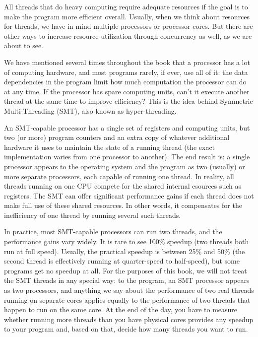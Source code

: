All threads that do heavy computing require adequate resources if the goal is to make the program more efficient overall. Usually, when we think about resources for threads, we have in mind multiple processors or processor cores. But there are other ways to increase resource utilization through concurrency as well, as we are about to see.


We have mentioned several times throughout the book that a processor has a lot of computing hardware, and most programs rarely, if ever, use all of it: the data dependencies in the program limit how much computation the processor can do at any time. If the processor has spare computing units, can't it execute another thread at the same time to improve efficiency? This is the idea behind Symmetric Multi-Threading (SMT), also known as hyper-threading.

An SMT-capable processor has a single set of registers and computing units, but two (or more) program counters and an extra copy of whatever additional hardware it uses to maintain the state of a running thread (the exact implementation varies from one processor to another). The end result is: a single processor appears to the operating system and the program as two (usually) or more separate processors, each capable of running one thread. In reality, all threads running on one CPU compete for the shared internal esources such as registers. The SMT can offer significant performance gains if each thread does not make full use of these shared resources. In other words, it compensates for the inefficiency of one thread by running several such threads.

In practice, most SMT-capable processors can run two threads, and the performance gains vary widely. It is rare to see 100\% speedup (two threads both run at full speed). Usually, the practical speedup is between 25\% and 50\% (the second thread is effectively running at quarter-speed to half-speed), but some programs get no speedup at all. For the purposes of this book, we will not treat the SMT threads in any special way: to the program, an SMT processor appears as two processors, and anything we say about the performance of two real threads running on separate cores applies equally to the performance of two threads that happen to run on the same core. At the end of the day, you have to measure whether running more threads than you have physical cores provides any speedup to your program and, based on that, decide how many threads you want to run.

